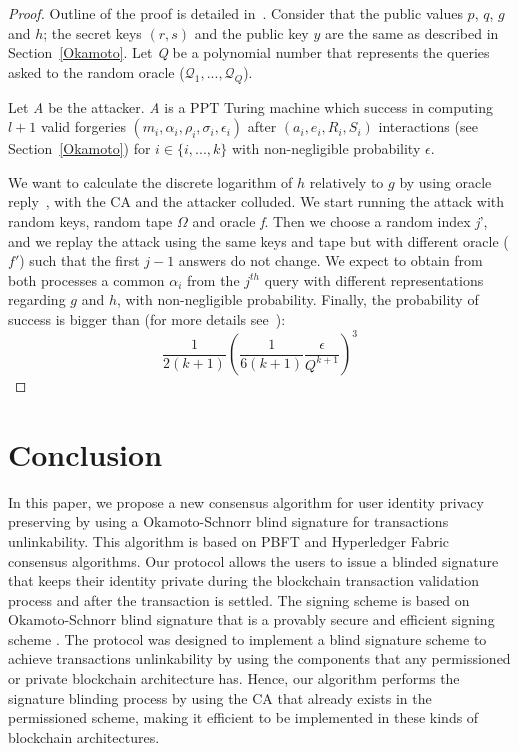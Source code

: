 \documentclass[conference]{llncs}
\begin{document}
\begin{proof}
Outline of the proof is detailed in~\cite{pointcheval1996provably}.
Consider that the public values $p$, $q$, $g$ and $h$; the secret keys $(r,s)$ and the public key $y$ are the same as described in Section~\ref{Okamoto}. Let \textit{Q} be a polynomial number that represents the queries asked to the random oracle ($\mathcal{Q}_1,...,\mathcal{Q}_Q$).

Let \textit{A} be the attacker. \textit{A} is a PPT Turing machine which success in computing  $l+1$ valid forgeries $(m_i,\alpha_i,\rho_i,\sigma_i,\epsilon_i)$ after $(a_i,e_i,R_i,S_i)$ interactions (see Section~\ref{Okamoto}) for $i\in\{i,...,k\}$ with non-negligible probability $\epsilon$.

We want to calculate the  discrete logarithm of $h$ relatively to $g$ by using oracle reply~\cite{10.1007/3-540-68339-9_33}, with the CA and the attacker colluded. We start running the attack with random keys, random tape $\Omega$ and oracle \textit{f}. Then we choose a random index \textit{j}', and we replay the attack using the same keys and tape but with different oracle ($f'$) such that the first $j-1$ answers do not change. We expect to obtain from both processes a common $\alpha_i$ from the $j^{th}$ query with different representations regarding $g$ and $h$, with non-negligible probability. Finally, the probability of success is bigger than (for more details see~\cite{pointcheval1996provably}):
\begin{equation}
    \frac{1}{2(k+1)}\left(\frac{1}{6(k+1)}\frac{\epsilon}{Q^{k+1}}\right)^3
\end{equation}
\end{proof}

\section{Conclusion} \label{conclu}
In this paper, we propose a new consensus algorithm for user identity privacy preserving by using a Okamoto-Schnorr blind signature for transactions unlinkability. This algorithm is based on PBFT and Hyperledger Fabric consensus algorithms. Our protocol allows the users to issue a blinded signature that keeps their identity private during the blockchain transaction validation process and after the transaction is settled. The signing scheme is based on Okamoto-Schnorr blind signature that is a provably secure \cite{pointcheval1996provably} and efficient signing scheme \cite{schnorr1991efficient}. The protocol was designed to implement a blind signature scheme to achieve transactions unlinkability by using the components that any permissioned or private blockchain architecture has. Hence, our algorithm performs the signature blinding process by using the CA that already exists in the permissioned scheme, making it efficient to be implemented in these kinds of blockchain architectures.
\end{document}
